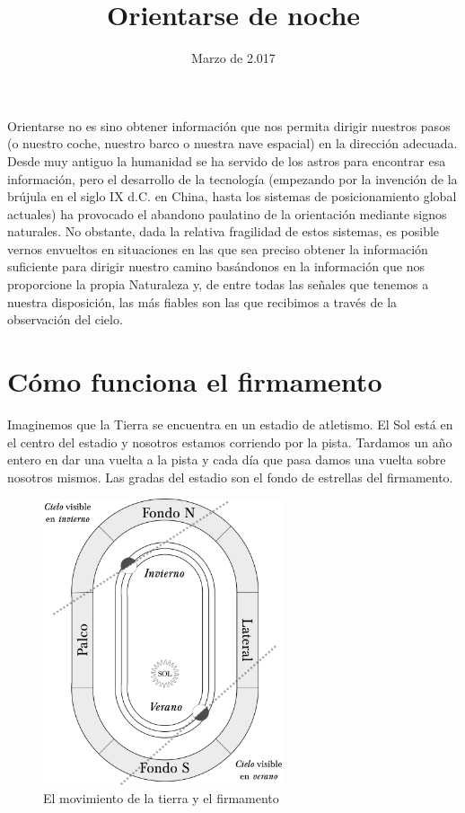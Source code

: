 \documentclass[11pt,a5paper,twoside]{amsbook}
\title{Orientarse de noche}
\date{Marzo de 2.017}
\begin{document}
\titulo

\tableofcontents

\cleardoublepage

\begin{sumario}[Introducci\'on]
Orientarse no es sino obtener información que nos permita dirigir nuestros pasos (o nuestro coche, nuestro barco o nuestra nave espacial) en la dirección adecuada. Desde muy antiguo la humanidad se ha servido de los astros para encontrar esa información, pero el desarrollo de la tecnología (empezando por la invención de la brújula en el siglo IX d.C. en China, hasta los sistemas de posicionamiento global actuales) ha provocado el abandono paulatino de la orientación mediante signos naturales. No obstante, dada la relativa fragilidad de estos sistemas, es posible vernos envueltos en situaciones en las que sea preciso obtener la información suficiente para dirigir nuestro camino basándonos en la información que nos proporcione la propia Naturaleza y, de entre todas las señales que tenemos a nuestra disposición, las más fiables son las que recibimos a través de la observación del cielo.
\end{sumario}

\section{C\'omo funciona el firmamento}

Imaginemos que la Tierra se encuentra en un estadio de atletismo. El Sol está en el centro del estadio y nosotros estamos corriendo por la pista. Tardamos un año entero en dar una vuelta a la pista y cada día que pasa damos una vuelta sobre nosotros mismos. Las gradas del estadio son el fondo de estrellas del firmamento.


\begin{figure}[ht]
 \centering
 \includegraphics[width=200pt,keepaspectratio=true]{./esquema_firmamento.png}
 \caption{El movimiento de la tierra y el firmamento}
 \label{carrera_tierra}
\end{figure}
\end{document}
